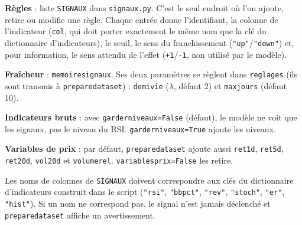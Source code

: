 \documentclass[11pt,a4paper]{article}
\renewcommand{\_}{\usorig\allowbreak}   %
\newcommand{\f}[1]{\texttt{#1}}        %
\begin{document}
\begin{danslecode}
\textbf{Règles} : liste \f{SIGNAUX} dans \f{signaux.py}. C'est le seul endroit où l'on
ajoute, retire ou modifie une règle. Chaque entrée donne l'identifiant, la colonne de
l'indicateur (\f{col}, qui doit porter exactement le même nom que la clé du dictionnaire
d'indicateurs), le seuil, le sens du franchissement (\f{"up"}/\f{"down"}) et, pour
information, le sens attendu de l'effet (\f{+1}/\f{-1}, non utilisé par le modèle).

\textbf{Fraîcheur} : \f{memoire\_signaux}. Ses deux paramètres se règlent dans
\f{reglages} (ils sont transmis à \f{prepare\_dataset}) :
\f{demi\_vie} ($\lambda$, défaut 2) et \f{max\_jours} (défaut 10).

\textbf{Indicateurs bruts} : avec \f{garder\_niveaux=False} (défaut), le modèle ne voit
que les signaux, pas le niveau du RSI. \f{garder\_niveaux=True} ajoute les niveaux.

\textbf{Variables de prix} : par défaut, \f{prepare\_dataset} ajoute aussi \f{ret\_1d},
\f{ret\_5d}, \f{ret\_20d}, \f{vol\_20d} et \f{volume\_rel}. \f{variables\_prix=False} les retire.
\end{danslecode}


\noindent Les noms de colonnes de \f{SIGNAUX} doivent correspondre aux clés du
dictionnaire d'indicateurs construit dans le script (\f{"rsi"}, \f{"bb\_pct"},
\f{"rev\_5"}, \f{"stoch"}, \f{"er"}, \f{"hist"}). Si un nom ne correspond pas, le signal
n'est jamais déclenché et \f{prepare\_dataset} affiche un avertissement.
\end{document}
